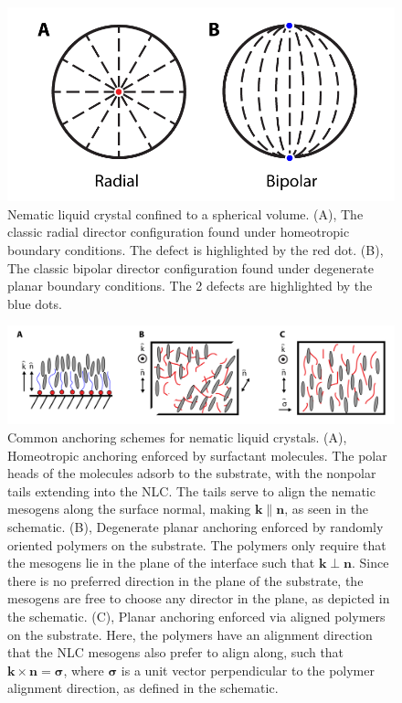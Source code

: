 \begin{figure}[h]
  \centering
  \includegraphics{figures/C2/Ch2-Figs_DropSchem.png}
  \caption{Nematic liquid crystal confined to a spherical volume.
  (A), The classic radial director configuration found under homeotropic boundary conditions.
  The defect is highlighted by the red dot.
  (B), The classic bipolar director configuration found under degenerate planar boundary conditions.
  The 2 defects are highlighted by the blue dots.}\label{f:2-DropSchem}
\end{figure}

\begin{figure}[h]
  \centering
  \includegraphics{figures/C2/Ch2-Figs_Anchor.png}
  \caption{Common anchoring schemes for nematic liquid crystals. (A), Homeotropic anchoring enforced by surfactant molecules.
  The polar heads of the molecules adsorb to the substrate, with the nonpolar tails extending into the NLC.
  The tails serve to align the nematic mesogens along the surface normal, making $\mathbf{k} \parallel \mathbf{n}$, as seen in the schematic.
  (B), Degenerate planar anchoring enforced by randomly oriented polymers on the substrate. The polymers only require that the mesogens lie in the plane of the interface such that $\mathbf{k} \perp \mathbf{n}$. Since there is no preferred direction in the plane of the substrate, the mesogens are free to choose any director in the plane, as depicted in the schematic.
  (C), Planar anchoring enforced via aligned polymers on the substrate. Here, the polymers have an alignment direction that the NLC mesogens also prefer to align along, such that $\mathbf{k} \times \mathbf{n} = \bm{\sigma}$, where $\bm{\sigma}$ is a unit vector perpendicular to the polymer alignment direction, as defined in the schematic.}\label{f:2-Anchor}
\end{figure}

